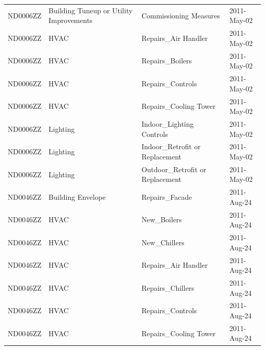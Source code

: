 \documentclass[12pt]{article}
\begin{document}
\begin{longtable}{lp{4cm}p{4cm}p{3cm}}
ND0006ZZ         & Building Tuneup or Utility Improvements & Commissioning Measures                    & 2011-May-02                   \\
ND0006ZZ         & HVAC                                    & Repairs\_Air Handler                      & 2011-May-02                   \\
ND0006ZZ         & HVAC                                    & Repairs\_Boilers                          & 2011-May-02                   \\
ND0006ZZ         & HVAC                                    & Repairs\_Controls                         & 2011-May-02                   \\
ND0006ZZ         & HVAC                                    & Repairs\_Cooling Tower                    & 2011-May-02                   \\
ND0006ZZ         & Lighting                                & Indoor\_Lighting Controls                 & 2011-May-02                   \\
ND0006ZZ         & Lighting                                & Indoor\_Retrofit or Replacement           & 2011-May-02                   \\
ND0006ZZ         & Lighting                                & Outdoor\_Retrofit or Replacement          & 2011-May-02                   \\
ND0046ZZ         & Building Envelope                       & Repairs\_Facade                           & 2011-Aug-24                   \\
ND0046ZZ         & HVAC                                    & New\_Boilers                              & 2011-Aug-24                   \\
ND0046ZZ         & HVAC                                    & New\_Chillers                             & 2011-Aug-24                   \\
ND0046ZZ         & HVAC                                    & Repairs\_Air Handler                      & 2011-Aug-24                   \\
ND0046ZZ         & HVAC                                    & Repairs\_Chillers                         & 2011-Aug-24                   \\
ND0046ZZ         & HVAC                                    & Repairs\_Controls                         & 2011-Aug-24                   \\
ND0046ZZ         & HVAC                                    & Repairs\_Cooling Tower                    & 2011-Aug-24                   \\

\end{longtable}
\end{document}
